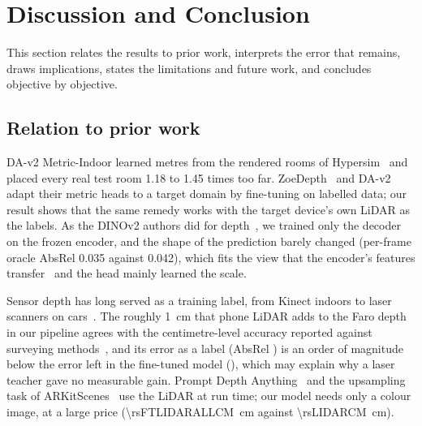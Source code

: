 \section{Discussion and Conclusion}\label{sec:discussion}

This section relates the results to prior work, interprets the error that remains, draws implications, states the
limitations and future work, and concludes objective by objective.

\subsection{Relation to prior work}\label{sec:prior}
\mbox{DA-v2} Metric-Indoor learned metres from the rendered rooms of Hypersim~\cite{da2,hypersim} and placed every real
test room 1.18 to 1.45 times too far. ZoeDepth~\cite{zoedepth} and \mbox{DA-v2} adapt their metric heads to a target
domain by fine-tuning on labelled data; our result shows that the same remedy works with the target device's own LiDAR
as the labels. As the DINOv2 authors did for depth~\cite{dinov2}, we trained only the decoder on the frozen encoder,
and the shape of the prediction barely changed (per-frame oracle AbsRel 0.035 against 0.042), which fits the view that
the encoder's features transfer~\cite{yosinski} and the head mainly learned the scale.

Sensor depth has long served as a training label, from Kinect indoors to laser scanners on
cars~\cite{nyuv2,kitti,eigen14}. The roughly \SI{1}{cm} that phone LiDAR adds to the Faro depth in our pipeline agrees
with the centimetre-level accuracy reported against surveying methods~\cite{luetzenburg,spreafico}, and its error as a
label (AbsRel \rsLIDARABSREL{}) is an order of magnitude below the error left in the fine-tuned model
(\rsFTLIDARALLABSREL{}), which may explain why a laser teacher gave no measurable gain. Prompt Depth
Anything~\cite{promptda} and the upsampling task of ARKitScenes~\cite{arkitscenes} use the LiDAR at run time; our model
needs only a colour image, at a large price (\SI{\rsFTLIDARALLCM}{cm} against \SI{\rsLIDARCM}{cm}).

